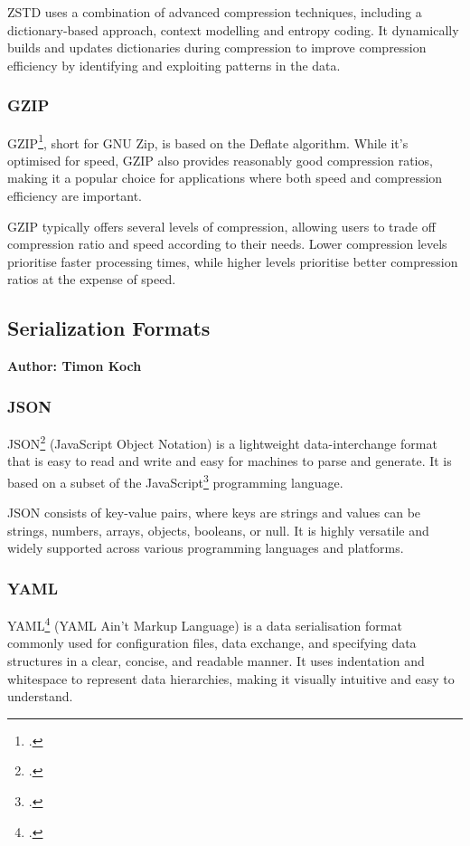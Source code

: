 ZSTD uses a combination of advanced compression techniques, including a dictionary-based approach, context modelling and entropy coding. It dynamically builds and updates dictionaries during compression to improve compression efficiency by identifying and exploiting patterns in the data.

\subsubsection{GZIP}
GZIP\footcite{gzip}, short for GNU Zip, is based on the Deflate algorithm. While it's optimised for speed, GZIP also provides reasonably good compression ratios, making it a popular choice for applications where both speed and compression efficiency are important.

GZIP typically offers several levels of compression, allowing users to trade off compression ratio and speed according to their needs. Lower compression levels prioritise faster processing times, while higher levels prioritise better compression ratios at the expense of speed.

\subsection{Serialization Formats}
\textbf{Author: Timon Koch}

\subsubsection{JSON}
JSON\footcite{json} (JavaScript Object Notation) is a lightweight data-interchange format that is easy to read and write and easy for machines to parse and generate. It is based on a subset of the JavaScript\footcite{javascript} programming language.

JSON consists of key-value pairs, where keys are strings and values can be strings, numbers, arrays, objects, booleans, or null. It is highly versatile and widely supported across various programming languages and platforms.

\subsubsection{YAML}
YAML\footcite{yaml} (YAML Ain't Markup Language) is a data serialisation format commonly used for configuration files, data exchange, and specifying data structures in a clear, concise, and readable manner. It uses indentation and whitespace to represent data hierarchies, making it visually intuitive and easy to understand.

